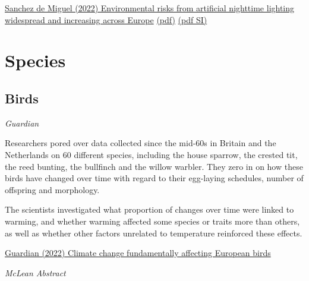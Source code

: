 \documentclass[
]{book}
\begin{document}
\href{https://www.science.org/doi/10.1126/sciadv.abl6891}{Sanchez de Miguel (2022) Environmental risks from artificial nighttime lighting widespread and increasing across Europe}
\href{pdf/Sanchez-de_Miguel_2022_Environmetal_Risks_from_Artificalial_Nighttime_Lightning.pdf}{(pdf)}
\href{pdf/Sanchez-de_Miguel_2022_Environmetal_Risks_from_Artificalial_Nighttime_Lightning_SI.pdf}{(pdf SI)}

\hypertarget{species}{%
\chapter{Species}\label{species}}

\hypertarget{birds}{%
\section{Birds}\label{birds}}

\emph{Guardian}

Researchers pored over data collected since the mid-60s in Britain and the Netherlands on 60 different species, including the house sparrow, the crested tit, the reed bunting, the bullfinch and the willow warbler. They zero in on how these birds have changed over time with regard to their egg-laying schedules, number of offspring and morphology.

The scientists investigated what proportion of changes over time were linked to warming, and whether warming affected some species or traits more than others, as well as whether other factors unrelated to temperature reinforced these effects.

\href{https://www.theguardian.com/environment/2022/mar/10/climate-change-fundamentally-affecting-european-birds-study-shows}{Guardian (2022) Climate change fundamentally affecting European birds}

\emph{McLean Abstract}
\end{document}
